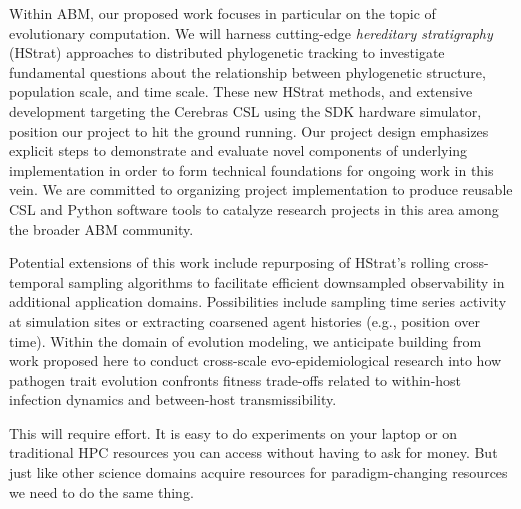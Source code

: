 Within ABM, our proposed work focuses in particular on the topic of evolutionary computation.
We will harness cutting-edge \textit{hereditary stratigraphy} (HStrat) approaches to distributed phylogenetic tracking to investigate fundamental questions about the relationship between phylogenetic structure, population scale, and time scale.
These new HStrat methods, and extensive development targeting the Cerebras CSL using the SDK hardware simulator, position our project to hit the ground running.
Our project design emphasizes explicit steps to demonstrate and evaluate novel components of underlying implementation in order to form technical foundations for ongoing work in this vein.
We are committed to organizing project implementation to produce reusable CSL and Python software tools to catalyze research projects in this area among the broader ABM community.

Potential extensions of this work include repurposing of HStrat's rolling cross-temporal sampling algorithms to facilitate efficient downsampled observability in additional application domains.
Possibilities include sampling time series activity at simulation sites or extracting coarsened agent histories (e.g., position over time).
Within the domain of evolution modeling, we anticipate building from work proposed here to conduct cross-scale evo-epidemiological research into how pathogen trait evolution confronts fitness trade-offs related to within-host infection dynamics and between-host transmissibility.

This will require effort.
It is easy to do experiments on your laptop or on traditional HPC resources you can access without having to ask for money.
But just like other science domains acquire resources for paradigm-changing resources we need to do the same thing.
